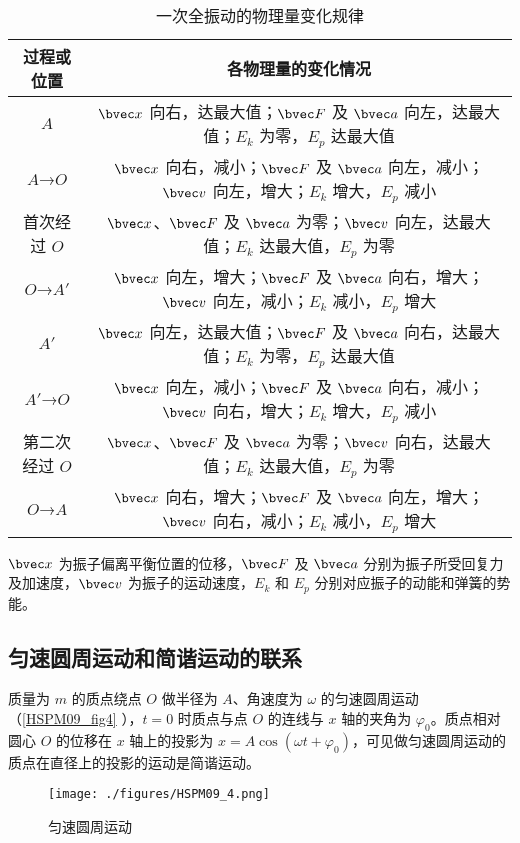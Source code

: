 \begin{table}[ht]
\centering
\caption{一次全振动的物理量变化规律}\label{HSPM09_tab1}
\begin{tabular}{|c|c|}
\hline
过程或位置 & 各物理量的变化情况 \\
\hline
$A$ & $\bvec x$ 向右，达最大值；$\bvec F$ 及 $\bvec a$ 向左，达最大值；$E_k$ 为零，$E_p$ 达最大值 \\
\hline
$A$→$O$ & $\bvec x$ 向右，减小；$\bvec F$ 及 $\bvec a$ 向左，减小；$\bvec v$ 向左，增大；$E_k$ 增大，$E_p$ 减小 \\
\hline
首次经过 $O$ & $\bvec x$、$\bvec F$ 及 $\bvec a$ 为零；$\bvec v$ 向左，达最大值；$E_k$ 达最大值，$E_p$ 为零 \\
\hline
$O$→$A'$ & $\bvec x$ 向左，增大；$\bvec F$ 及 $\bvec a$ 向右，增大；$\bvec v$ 向左，减小；$E_k$ 减小，$E_p$ 增大 \\
\hline
$A'$ & $\bvec x$ 向左，达最大值；$\bvec F$ 及 $\bvec a$ 向右，达最大值；$E_k$ 为零，$E_p$ 达最大值 \\
\hline
$A'$→$O$ & $\bvec x$ 向左，减小；$\bvec F$ 及 $\bvec a$ 向右，减小；$\bvec v$ 向右，增大；$E_k$ 增大，$E_p$ 减小 \\
\hline
第二次经过 $O$ & $\bvec x$、$\bvec F$ 及 $\bvec a$ 为零；$\bvec v$ 向右，达最大值；$E_k$ 达最大值，$E_p$ 为零 \\
\hline
$O$→$A$ & $\bvec x$ 向右，增大；$\bvec F$ 及 $\bvec a$ 向左，增大；$\bvec v$ 向右，减小；$E_k$ 减小，$E_p$ 增大 \\
\hline
\end{tabular}
\end{table}
$\bvec x$ 为振子偏离平衡位置的位移，$\bvec F$ 及 $\bvec a$ 分别为振子所受回复力及加速度，$\bvec v$ 为振子的运动速度，$E_k$ 和 $E_p$ 分别对应振子的动能和弹簧的势能。

\subsection{匀速圆周运动和简谐运动的联系}

质量为 $m$ 的质点绕点 $O$ 做半径为 $A$、角速度为 $\omega$ 的匀速圆周运动（\autoref{HSPM09_fig4} ），$t=0$ 时质点与点 $O$ 的连线与 $x$ 轴的夹角为 $\varphi_0$。质点相对圆心 $O$ 的位移在 $x$ 轴上的投影为 $x=A\cos(\omega t + \varphi_0)$，可见做匀速圆周运动的质点在直径上的投影的运动是简谐运动。

\begin{figure}[ht]
\centering
\texttt{[image: ./figures/HSPM09\_4.png]}
\caption{匀速圆周运动} \label{HSPM09_fig4}
\end{figure}

